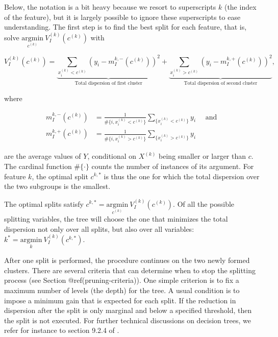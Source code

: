 Below, the notation is a bit heavy because we resort to superscripts $k$ (the index of the feature), but it is largely possible to ignore these superscripts to ease understanding. The first step is to find the best split for each feature, that is, solve $\underset{c^{(k)}}{\text{argmin}} \ V^{(k)}_I(c^{(k)})$ with

\begin{equation}
V^{(k)}_I(c^{(k)})= \underbrace{\sum_{x_i^{(k)}<c^{(k)}}\left(y_i-m_I^{k,-}(c^{(k)}) \right)^2}_{\text{Total dispersion of first cluster}} + \underbrace{\sum_{x_i^{(k)}>c^{(k)}}\left(y_i-m_I^{k,+}(c^{(k)}) \right)^2}_{\text{Total dispersion of second cluster}},
\end{equation}

where

\begin{equation}
\begin{aligned}
m_I^{k,-}(c^{(k)})&=\frac{1}{\#\{i,x_i^{(k)}<c^{(k)} \}}\sum_{\{x_i^{(k)}<c^{(k)} \}}y_i \quad \text{ and } \\ m_I^{k,+}(c^{(k)})&=\frac{1}{\#\{i,x_i^{(k)}>c^{(k)} \}}\sum_{\{x_i^{(k)}>c^{(k)} \}}y_i
\end{aligned}
\end{equation}

are the average values of $Y$, conditional on $X^{(k)}$ being smaller or larger than $c$. The cardinal function $\#\{\cdot\}$ counts the number of instances of its argument. For feature $k$, the optimal split $c^{k,*}$ is thus the one for which the total dispersion over the two subgroups is the smallest.

The optimal splits satisfy $c^{k,*}= \underset{c^{(k)}}{\text{argmin}} \ V^{(k)}_I(c^{(k)})$. Of all the possible splitting variables, the tree will choose the one that minimizes the total dispersion not only over all splits, but also over all variables: $k^*=\underset{k}{\text{argmin}} \ V^{(k)}_I(c^{k,*})$.

After one split is performed, the procedure continues on the two newly formed clusters. There are several criteria that can determine when to stop the splitting process (see Section @ref(pruning-criteria)). One simple criterion is to fix a maximum number of levels (the depth) for the tree. A usual condition is to impose a minimum gain that is expected for each split. If the reduction in dispersion after the split is only marginal and below a specified threshold, then the split is not executed. For further technical discussions on decision trees, we refer for instance to section 9.2.4 of \cite{friedman2009elements}.

